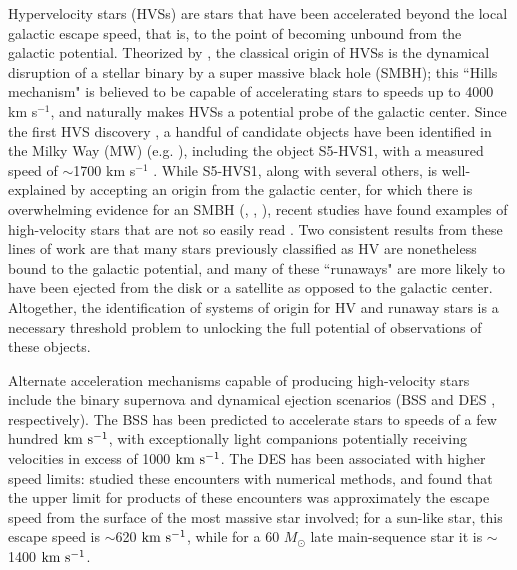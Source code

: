 \documentclass[twocolumn]{aastex631}
\newcommand{\kms}{${\rm km~s^{-1}}$}
\begin{document}
Hypervelocity stars (HVSs) are stars that have been accelerated beyond the local galactic escape speed, that is, to the point of becoming unbound from the galactic potential.
Theorized by \citealt{1988Natur.331..687H}, the classical origin of HVSs is the dynamical disruption of a stellar binary by a super massive black hole (SMBH); this ``Hills mechanism" is believed to be capable of accelerating stars to speeds up to 4000 km s$^{-1}$, and naturally makes HVSs a potential probe of the galactic center.
Since the first HVS discovery \citep{2005ApJ...622L..33B}, a handful of candidate objects have been identified in the Milky Way (MW) (e.g. \citealt{2014ApJ...787...89B}), including the object S5-HVS1, with a measured speed of $\sim$1700 km s$^{-1}$ \citep{2020MNRAS.491.2465K}.
While S5-HVS1, along with several others, is well-explained by accepting an origin from the galactic center, for which there is overwhelming evidence for an SMBH (\citealt{1998ApJ...509..678G}, \citealt{2018A&A...615L..15G}, \citealt{2022ApJ...930L..12E}), recent studies have found examples of high-velocity stars that are not so easily read \citep[e.g.][]{2018MNRAS.479.2789B, 2019MNRAS.483.2007E, 2021A&A...646L...4I}.
Two consistent results from these lines of work are that many stars previously classified as HV are nonetheless bound to the galactic potential, and many of these ``runaways" are more likely to have been ejected from the disk or a satellite as opposed to the galactic center.
Altogether, the identification of systems of origin for HV and runaway stars is a necessary threshold problem to unlocking the full potential of observations of these objects.

Alternate acceleration mechanisms capable of producing high-velocity stars include the binary supernova and dynamical ejection scenarios (BSS \citep{1967BOTT....4...86P} and DES \citep{1961BAN....15..265B}, respectively).
The BSS has been predicted to accelerate stars to speeds of a few hundred \kms \citep{2019A&A...624A..66R, 2022MNRAS.tmp.3236I}, with exceptionally light companions potentially receiving velocities in excess of 1000 \kms \citep{2015MNRAS.448L...6T}.
The DES has been associated with higher speed limits: \citet{1991AJ....101..562L} studied these encounters with numerical methods, and found that the upper limit for products of these encounters was approximately the escape speed from the surface of the most massive star involved; for a sun-like star, this escape speed is $\sim$620 \kms, while for a 60 $M_\odot$ late main-sequence star it is $\sim$1400 \kms.
\end{document}

